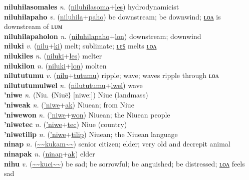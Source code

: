 \textbf{niluhilasomales} \textit{n.} (\hyperref[niluhilasoma]{niluhilasoma}+\hyperref[les]{les})
hydrodynamicist \label{niluhilasomales} \\
\textbf{niluhilapaho} \textit{v.} (\hyperref[niluhila]{niluhila}+\hyperref[paho]{paho})
be downstream; be downwind; \hyperref[niluhilapaholon]{ʟᴏᴧ} is downstream of ʟᴜᴍ \label{niluhilapaho} \\
\textbf{niluhilapaholon} \textit{n.} (\hyperref[niluhilapaho]{niluhilapaho}+\hyperref[lon]{lon})
downstream; downwind \label{niluhilapaholon} \\
\textbf{niluki} \textit{v.} (\hyperref[nilu]{nilu}+\hyperref[ki]{ki})
melt; sublimate; \hyperref[nilukiles]{ʟєꜱ} melts \hyperref[nilukilon]{ʟᴏᴧ} \label{niluki} \\
\textbf{nilukiles} \textit{n.} (\hyperref[niluki]{niluki}+\hyperref[les]{les})
melter \label{nilukiles} \\
\textbf{nilukilon} \textit{n.} (\hyperref[niluki]{niluki}+\hyperref[lon]{lon})
molten \label{nilukilon} \\
\textbf{nilututumu} \textit{v.} (\hyperref[nilu]{nilu}+\hyperref[tutumu]{tutumu})
ripple; wave; waves ripple through ʟᴏᴧ \label{nilututumu} \\
\textbf{nilututumulwel} \textit{n.} (\hyperref[nilututumu]{nilututumu}+\hyperref[lwel]{lwel})
wave \label{nilututumulwel} \\
\textbf{'niwe} \textit{n.} (Niu. ⟨Niuē⟩ [niweː])
Niue (landmass) \label{'niwe} \\
\textbf{'niweak} \textit{n.} (\hyperref['niwe]{'niwe}+\hyperref[ak]{ak})
Niuean; from Niue \label{'niweak} \\
\textbf{'niwewon} \textit{n.} (\hyperref['niwe]{'niwe}+\hyperref[won]{won})
Niuean; the Niuean people \label{'niwewon} \\
\textbf{'niwetec} \textit{n.} (\hyperref['niwe]{'niwe}+\hyperref[tec]{tec})
Niue (country) \label{'niwetec} \\
\textbf{'niwetilip} \textit{n.} (\hyperref['niwe]{'niwe}+\hyperref[tilip]{tilip})
Niuean; the Niuean language \label{'niwetilip} \\
\textbf{ninap} \textit{n.} (\hyperref[kukam]{\~{}\~{}kukam\~{}\~{}})
senior citizen; elder; very old and decrepit animal \label{ninap} \\
\textbf{ninapak} \textit{n.} (\hyperref[ninap]{ninap}+\hyperref[ak]{ak})
elder \label{ninapak} \\
\textbf{nihu} \textit{v.} (\hyperref[kuci]{\~{}\~{}kuci\~{}\~{}})
be sad; be sorrowful; be anguished; be distressed; \hyperref[nihulon]{ʟᴏᴧ} feels sad \label{nihu} \\

